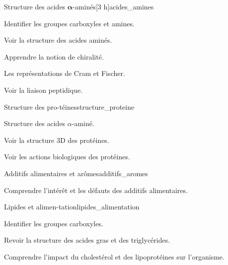 \begin{multicols}{2}
  \begin{activite}{Structure des acides $\mathbf{\alpha}$-aminés}[3 h]{acides_amines}
    \begin{prerequis}
      \item Identifier les groupes carboxyles et amines.
    \end{prerequis}
    \begin{objectifs}  
      \item Voir la structure des acides aminés.
      \item Apprendre la notion de chiralité.
      \item Les représentations de Cram et Fischer.
      \item Voir la liaison peptidique.
    \end{objectifs}
  \end{activite}

  \begin{activite}{Structure des pro-téines}{structure_proteine}
    \begin{prerequis}
      \item Structure des acides $\alpha$-aminé.
    \end{prerequis}
    \begin{objectifs}
      \item Voir la structure 3D des protéines.
      \item Voir les actions biologiques des protéines.
    \end{objectifs}
  \end{activite}

  \setcounter{activiteNum}{4}
  \begin{activite}{Additifs alimentaires et arômes}{additifs_aromes}
    \begin{objectifs}
      \item Comprendre l'intérêt et les défauts des additifs alimentaires.
    \end{objectifs}
  \end{activite}

  \setcounter{activiteNum}{2}
  \begin{activite}{Lipides et alimen-tation}{lipides_alimentation}
    \begin{prerequis}
      \item Identifier les groupes carboxyles.
    \end{prerequis}
    \begin{objectifs}
      \item Revoir la structure des acides gras et des triglycérides.
      \item Comprendre l'impact du cholestérol et des lipoprotéines sur l'organisme.
    \end{objectifs}
  \end{activite}


\end{multicols}

